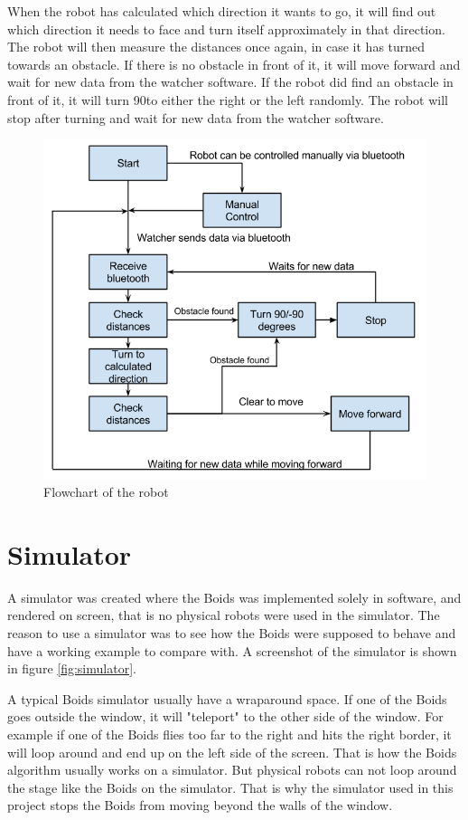 When the robot has calculated which direction it wants to go, it will find out which direction it needs to face and turn itself approximately in that direction. The robot will then measure the distances once again, in case it has turned towards an obstacle. If there is no obstacle in front of it, it will move forward and wait for new data from the watcher software. If the robot did find an obstacle in front of it, it will turn 90\textdegree to either the right or the left randomly. The robot will stop after turning and wait for new data from the watcher software. 
\begin{figure}[h!]
\begin{center}
\includegraphics[width=0.8\linewidth]{figs/robotschema}
\end{center}
\caption[Robot flowchart]{Flowchart of the robot}
\label{fig:robotschema}
\end{figure}

\section{Simulator}
A simulator was created where the Boids was implemented solely in software, and rendered on screen, that is no physical robots were used in the simulator. The reason to use a simulator was to see how the Boids were supposed to behave and have a working example to compare with. A screenshot of the simulator is shown in figure \ref{fig:simulator}.

A typical Boids simulator usually have a wraparound space. If one of the Boids goes outside the window, it will "teleport" to the other side of the window. For example if one of the Boids flies too far to the right and hits the right border, it will loop around and end up on the left side of the screen. That is how the Boids algorithm usually works on a simulator. But physical robots can not loop around the stage like the Boids on the simulator. That is why the simulator used in this project stops the Boids from moving beyond the walls of the window.

